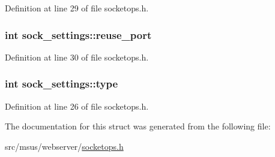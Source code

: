 Definition at line 29 of file socketops.\-h.

\hypertarget{structsock__settings_a9c727193200daa5ef25f9a74e983de1f}{
\subsubsection[{reuse\-\_\-port}]{\setlength{\rightskip}{0pt plus 5cm}int sock\-\_\-settings\-::reuse\-\_\-port}}\label{structsock__settings_a9c727193200daa5ef25f9a74e983de1f}


Definition at line 30 of file socketops.\-h.

\hypertarget{structsock__settings_afbd04165a11524a3a0ff83702958398f}{
\subsubsection[{type}]{\setlength{\rightskip}{0pt plus 5cm}int sock\-\_\-settings\-::type}}\label{structsock__settings_afbd04165a11524a3a0ff83702958398f}


Definition at line 26 of file socketops.\-h.



The documentation for this struct was generated from the following file\-:\begin{DoxyCompactItemize}
\item 
src/msus/webserver/\hyperlink{socketops_8h}{socketops.\-h}\end{DoxyCompactItemize}
